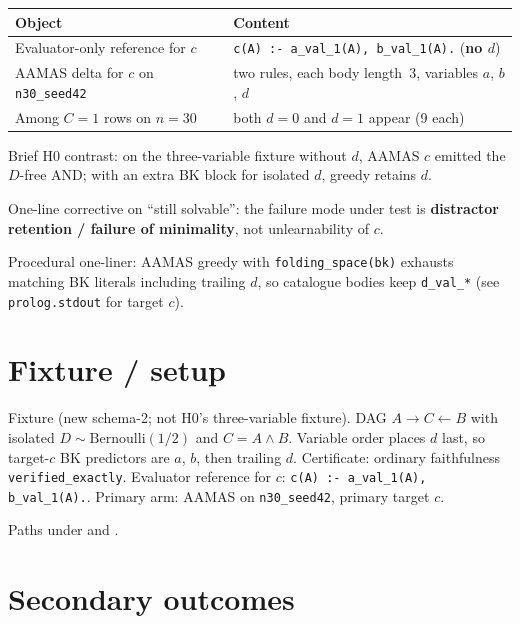 \documentclass[11pt]{article}
\begin{document}
\begin{center}
\begin{tabular}{@{}L{0.40\textwidth}L{0.50\textwidth}@{}}
\toprule
Object & Content \\
\midrule
Evaluator-only reference for \(c\) &
  \texttt{c(A) :- a\_val\_1(A), b\_val\_1(A).} (\textbf{no \(d\)}) \\
AAMAS delta for \(c\) on \texttt{n30\_seed42} &
  two rules, each body length~3, variables \(a\), \(b\), \textbf{\(d\)} \\
Among \(C{=}1\) rows on \(n{=}30\) &
  both \(d{=}0\) and \(d{=}1\) appear (9 each) \\
\bottomrule
\end{tabular}
\end{center}

Brief H0 contrast: on the three-variable fixture without \(d\), AAMAS \(c\)
emitted the \(D\)-free AND; with an extra BK block for isolated \(d\), greedy
retains \(d\).

One-line corrective on ``still solvable'': the failure mode under test is
\textbf{distractor retention / failure of minimality}, not unlearnability of
\(c\).

Procedural one-liner: AAMAS greedy with \texttt{folding\_space(bk)} exhausts
matching BK literals including trailing \(d\), so catalogue bodies keep
\texttt{d\_val\_*} (see \texttt{prolog.stdout} for target \(c\)).

\section{Fixture / setup}

Fixture  (new schema-2; not H0's
three-variable fixture).
DAG \(A\to C\leftarrow B\) with isolated \(D\sim\mathrm{Bernoulli}(1/2)\) and
\(C=A\land B\).
Variable order places \(d\) last, so target-\(c\) BK predictors are \(a\), \(b\),
then trailing \(d\).
Certificate: ordinary faithfulness \texttt{verified\_exactly}.
Evaluator reference for \(c\): \texttt{c(A) :- a\_val\_1(A), b\_val\_1(A).}.
Primary arm: AAMAS on \texttt{n30\_seed42}, primary target \(c\).

Paths under
and
.

\section{Secondary outcomes}
\end{document}
